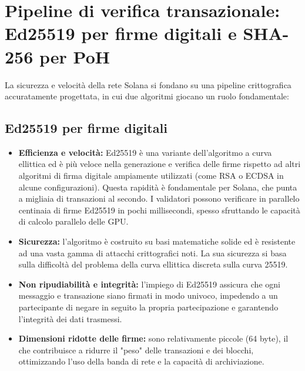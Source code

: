 \documentclass[a4paper,12pt]{report}
\begin{document}
	\section{Pipeline di verifica transazionale: Ed25519 per firme digitali e SHA-256 per PoH}
	La sicurezza e velocità della rete Solana si fondano su una pipeline crittografica accuratamente progettata, in cui due algoritmi giocano un ruolo fondamentale:
	
	\subsection{Ed25519 per firme digitali}
	\begin{itemize}
		\item \textbf{Efficienza e velocità:} Ed25519 è una variante dell'algoritmo a curva ellittica ed è più veloce nella generazione e verifica delle firme rispetto ad altri algoritmi di firma digitale ampiamente utilizzati (come RSA o ECDSA in alcune configurazioni). Questa rapidità è fondamentale per Solana, che punta a migliaia di transazioni al secondo. I validatori possono verificare in parallelo centinaia di firme Ed25519 in pochi millisecondi, spesso sfruttando le capacità di calcolo parallelo delle GPU.
		\item \textbf{Sicurezza:} l'algoritmo è costruito su basi matematiche solide ed è resistente ad una vasta gamma di attacchi crittografici noti. La sua sicurezza si basa sulla difficoltà del problema della curva ellittica discreta sulla curva 25519.
		\item \textbf{Non ripudiabilità e integrità:} l'impiego di Ed25519 assicura che ogni messaggio e transazione siano firmati in modo univoco, impedendo a un partecipante di negare in seguito la propria partecipazione e garantendo l'integrità dei dati trasmessi.
		\item \textbf{Dimensioni ridotte delle firme:} sono relativamente piccole (64 byte), il che contribuisce a ridurre il "peso" delle transazioni e dei blocchi, ottimizzando l'uso della banda di rete e la capacità di archiviazione.
	\end{itemize}
	
\end{document}
